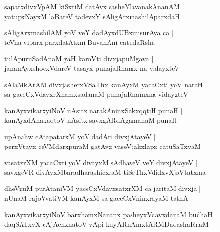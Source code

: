 \begin{shloka}
sapatxdivxVpAM kiSxtiM datAvx sasheYlavanakAnanAM |\\
yatupxNayxM laBateV tadevxY sAligArxmashilAparxdaH
\end{shloka}

\begin{shloka}
sAligArxmashilAM yoV veY dadAyxdUBxmisurAya ca |\\
teVna viparx parxdatAtxni BuvanAni catudaRsha
\end{shloka}

\begin{shloka}
tulApuruSadAnaM yaH karoVti divxjapuMgava |\\
jananAyxshocxVdareV tasayx punajaRnamx na vidayxteV 
\end{shloka}

\begin{shloka}
sAlaMkArAM divxjasherxVSaThx kanAyxM yacaCxti yoV naraH |\\
sa gaceCxVdavxrXhamxsadanaM punajaRnamxna vidayxteV 
\end{shloka}

\begin{shloka}
kanAyxvikarxyiNoV nAsitx narakAninxSakxqqtiH punaH |\\
kanAyxdAnakaqtoV nAsitx savxgARdAgamanaM punaH 
\end{shloka}

\begin{shloka}
upAnahw cAtapatarxM yoV dadAti divxjAtayeV |\\
perxVtayx ceVMdarxpuraM gatAvx vaseVtakxlapx catuSaTxyaM
\end{shloka}

\begin{shloka}
vasatxrXM yacaCxti yoV divayxM sAdhaveV veY divxjAtayeV |\\
savxgeVR divAyxMbaradharashicxraM tiSeThxVdidxvXjoVtatxma
\end{shloka}

\begin{shloka}
dheVnuM purAtaniVM yaceCxVdavxsatxrXM ca jaritaM divxja |\\
nUnaM rajoVvatiVM kanAyxM sa gaceCxVninxrayaM tathA
\end{shloka}

\begin{shloka}
kanAyxvikarxyiNoV barxhamxNananx pasheyxVdavxdanaM budhaH |\\
daqSATxvX cAjAcnxnatoV vApi kuyARnAmxtARMDadashaRnaM
\end{shloka}

